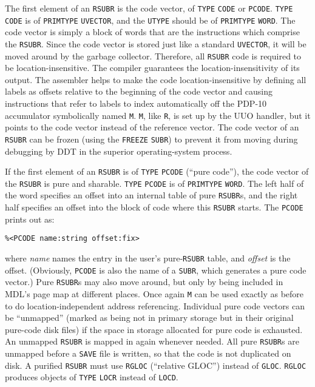 \documentclass[a4paper]{scrbook}
\begin{document}
The first element of an \texttt{RSUBR} is the code vector, of \texttt{TYPE} \texttt{CODE}  or
\texttt{PCODE}. \texttt{TYPE} \texttt{CODE} is of \texttt{PRIMTYPE} \texttt{UVECTOR}, and the
\texttt{UTYPE} should be of \texttt{PRIMTYPE} \texttt{WORD}. The code vector is simply a block of words that are the
instructions which comprise the \texttt{RSUBR}. Since the code vector is stored just like a standard \texttt{UVECTOR}, it
will be moved around by the garbage collector. Therefore, all \texttt{RSUBR} code is required to be location-insensitive.
The compiler guarantees the location-insensitivity of its output. The assembler helps to make the code location-insensitive
by defining all labels as offsets relative to the beginning of the code vector and causing instructions that refer to
labels to index automatically off the PDP-10 accumulator symbolically named \texttt{M}. \texttt{M}, like \texttt{R}, is set
up by the UUO handler, but it points to the code vector instead of the reference vector. The code vector of an
\texttt{RSUBR} can be frozen (using the \texttt{FREEZE} \texttt{SUBR}) to prevent it from moving
during debugging by DDT in the superior operating-system process.

If the first element of an \texttt{RSUBR} is of \texttt{TYPE} \texttt{PCODE} (``pure code''), the code vector of the
\texttt{RSUBR} is pure and sharable. \texttt{TYPE} \texttt{PCODE} is of \texttt{PRIMTYPE} \texttt{WORD}. The left half of
the word specifies an offset into an internal table of pure \texttt{RSUBR}s, and the right half specifies an offset into
the block of code where this \texttt{RSUBR} starts. The \texttt{PCODE} prints out as:

\begin{verbatim}
%<PCODE name:string offset:fix>
\end{verbatim}

where \emph{name} names the entry in the user's pure-\texttt{RSUBR} table, and \emph{offset} is the offset. (Obviously,
\texttt{PCODE} is also the name of a \texttt{SUBR}, which generates a pure code vector.) Pure \texttt{RSUBR}s may also move
around, but only by being included in MDL's page map at different places. Once again \texttt{M} can be used exactly as
before to do location-independent address referencing. Individual pure code vectors can be ``unmapped'' (marked as being
not in primary storage but in their original pure-code disk files) if the space in storage allocated for pure code is
exhausted. An unmapped \texttt{RSUBR} is mapped in again whenever needed. All pure \texttt{RSUBR}s are unmapped before a
\texttt{SAVE} file is written, so that the code is not duplicated on disk. A purified \texttt{RSUBR}
must use \texttt{RGLOC} (``relative GLOC'') instead of \texttt{GLOC}.
\texttt{RGLOC} produces objects of \texttt{TYPE} \texttt{LOCR} instead of \texttt{LOCD}.
\end{document}

